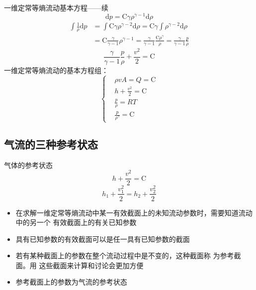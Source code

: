 \begin{frame}{一维定常等熵流动基本方程——续}
  \vspace*{-1.5em}
  \begin{equation*}
    \mathrm{d}p
    =
    \mathrm{C}\gamma\rho^{\gamma-1}\mathrm{d}\rho
  \end{equation*}
  \begin{equation*}
    \begin{aligned}
    \int{\frac{1}{\rho}}\mathrm{d}p
    &=
    \int{\mathrm{C}\gamma\rho^{\gamma-2}}
    \mathrm{d}\rho
    =
    \mathrm{C}\gamma
    \int{\rho^{\gamma-2}}\mathrm{d}\rho
    \\
    &=
    \mathrm{C}
    \frac{\gamma}{\gamma-1}
    \rho^{\gamma-1}
    =
    \frac{\gamma}{\gamma-1}
    \frac{\mathrm{C}\rho^{\gamma}}{\rho}
    =
    \frac{\gamma}{\gamma-1}
    \frac{p}{\rho}
    \end{aligned}
  \end{equation*}
  \begin{equation*}
    \frac{\gamma}{\gamma-1}
    \frac{p}{\rho}
    +
    \frac{v^{2}}{2}
    =
    \mathrm{C}
  \end{equation*}
  一维定常等熵流动的基本方程组：
  \begin{equation*}
    \left\{
      \begin{aligned}
        &\rho vA = Q = \mathrm{C} 
        \\
        &
        h
        +
        \frac{v^{2}}{2}
        =
        \mathrm{C}
        \\
        &
        \frac{p}{\rho}
        =
        RT
        \\
        &
        \frac{p}{\rho^{\gamma}}
        =
        \mathrm{C}
      \end{aligned}
      \right.
  \end{equation*}

\end{frame}

\subsection{气流的三种参考状态}
\begin{frame}{气体的参考状态}
 \begin{equation*}
 h
 +
 \frac{v^{2}}{2}
 =
 \mathrm{C}
 \end{equation*} 
 \begin{equation*}
   h_{1}
   +
   \frac{v_{1}^{2}}{2}
   =
   h_{2}
   +
   \frac{v_{2}^{2}}{2}
 \end{equation*}
 \begin{itemize}
   \item 在求解一维定常等熵流动中某一有效截面上的未知流动参数时，需要知道流动中的另一个
 有效截面上的有关已知参数
   \item 具有已知参数的有效截面可以是任一具有已知参数的截面
   \item 若有某种{\color{blue}截面上的参数在整个流动过程中是不变的}，这种截面称
     为{\color{blue}参考截面}。用
     这些截面来计算和讨论会更加方便
   \item 参考截面上的参数为{\color{blue}气流的参考状态}
 \end{itemize}
\end{frame}
